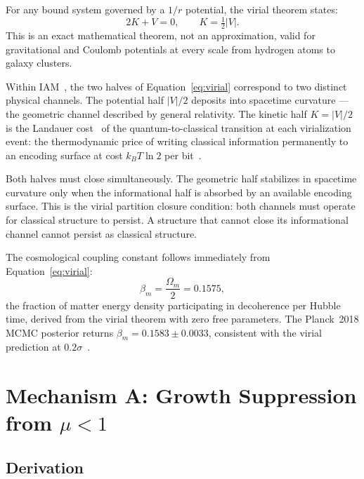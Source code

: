 \documentclass[12pt,a4paper]{article}
\begin{document}
For any bound system governed by a $1/r$ potential, the virial theorem states:
\begin{equation}
2K + V = 0, \qquad K = \tfrac{1}{2}|V|.
\label{eq:virial}
\end{equation}
This is an exact mathematical theorem, not an approximation, valid for
gravitational and Coulomb potentials at every scale from hydrogen atoms to
galaxy clusters.

Within IAM~\citep{IAM_theory}, the two halves of
Equation~\ref{eq:virial} correspond to two distinct physical channels. The
potential half $|V|/2$ deposits into spacetime curvature --- the geometric
channel described by general relativity. The kinetic half $K = |V|/2$ is the
Landauer cost~\citep{Landauer1961,IAM_thermo_virial} of the quantum-to-classical transition at
each virialization event: the thermodynamic price of writing classical
information permanently to an encoding surface at cost $k_B T \ln 2$ per
bit~\citep{Jacobson1995, CaiKim2005}.

Both halves must close simultaneously. The geometric half stabilizes in
spacetime curvature only when the informational half is absorbed by an
available encoding surface. This is the virial partition closure condition:
both channels must operate for classical structure to persist. A structure
that cannot close its informational channel cannot persist as classical
structure.

The cosmological coupling constant follows immediately from
Equation~\ref{eq:virial}:
\begin{equation}
\beta_m = \frac{\Omega_m}{2} = 0.1575,
\label{eq:beta}
\end{equation}
the fraction of matter energy density participating in decoherence per Hubble
time, derived from the virial theorem with zero free parameters. The
Planck~2018 MCMC posterior returns $\beta_m = 0.1583 \pm 0.0033$, consistent
with the virial prediction at $0.2\sigma$~\citep{IAM_obs}.

\section{Mechanism A: Growth Suppression from $\mu < 1$}
\label{sec:mechA}

\subsection{Derivation}
\end{document}
